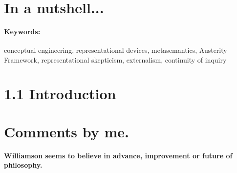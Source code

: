 \documentclass[
10pt, %
a4paper, %
twocolumn, %
landscape %
]{article}
\begin{document}
\pagestyle{myheadings} %
\markright{\doctitle} %


\thispagestyle{plain} %

\printtitle %


\section*{In a nutshell... }


\paragraph{Keywords:} 
conceptual engineering,
representational devices,
metasemantics,
Austerity Framework,
representational skepticism,
externalism,
continuity of inquiry

\section*{1.1 Introduction}


\section*{Comments by me.}
\paragraph{Williamson seems to believe in advance, improvement or future of philosophy. }

\renewcommand{\refname}{Reference} %


\end{document}
